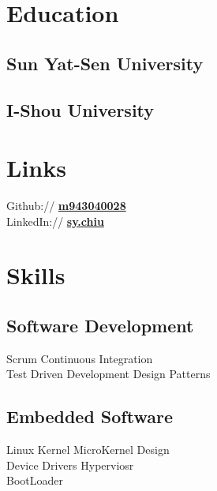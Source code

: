 \documentclass[letterpaper]{deedy-resume} %
\begin{document}
\begin{minipage}[t]{0.33\textwidth} %

\section{Education}

\subsection{Sun Yat-Sen University}



\subsection{I-Shou University}


\sectionspace %

\section{Links} 

Github:// \href{https://github.com/m943040028}{\bf m943040028} \\
LinkedIn:// \href{http://lnkd.in/Exzyne}{\bf sy.chiu} \\

\sectionspace %

\section{Skills}

\subsection{Software Development}
Scrum \textbullet{} Continuous Integration \textbullet{} \\
Test Driven Development \textbullet{} Design Patterns

\subsection{Embedded Software}
Linux Kernel \textbullet{} MicroKernel Design \textbullet{} \\
Device Drivers \textbullet{} Hyperviosr \textbullet{} \\
BootLoader \textbullet{}


\end{minipage}
\end{document}
